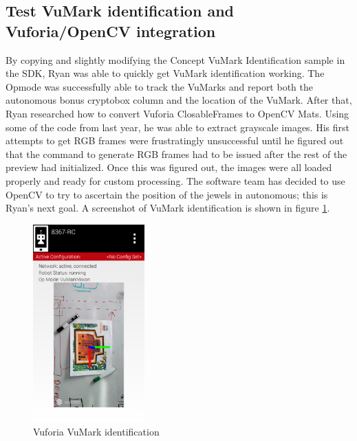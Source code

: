 \documentclass{article}
\begin{document}
\subsection{Test VuMark identification and Vuforia/OpenCV integration}
By copying and slightly modifying the Concept VuMark Identification sample in the SDK, Ryan was able to quickly get VuMark identification working. The Opmode was successfully able to track the VuMarks and report both the autonomous bonus cryptobox column and the location of the VuMark. After that, Ryan researched how to convert Vuforia ClosableFrames to OpenCV Mats. Using some of the code from last year, he was able to extract grayscale images. His first attempts to get RGB frames were frustratingly unsuccessful until he figured out that the command to generate RGB frames had to be issued after the rest of the preview had initialized. Once this was figured out, the images were all loaded properly and ready for custom processing. The software team has decided to use OpenCV to try to ascertain the position of the jewels in autonomous; this is Ryan's next goal. A screenshot of VuMark identification is shown in figure \ref{fig:vumark}.
\begin{figure}[h]
    \centering
    \includegraphics[width=.6\textwidth,height=3in,keepaspectratio]{01/images/vumark.png}
    \caption{Vuforia VuMark identification}
    \label{fig:vumark}
\end{figure}
\end{document}
